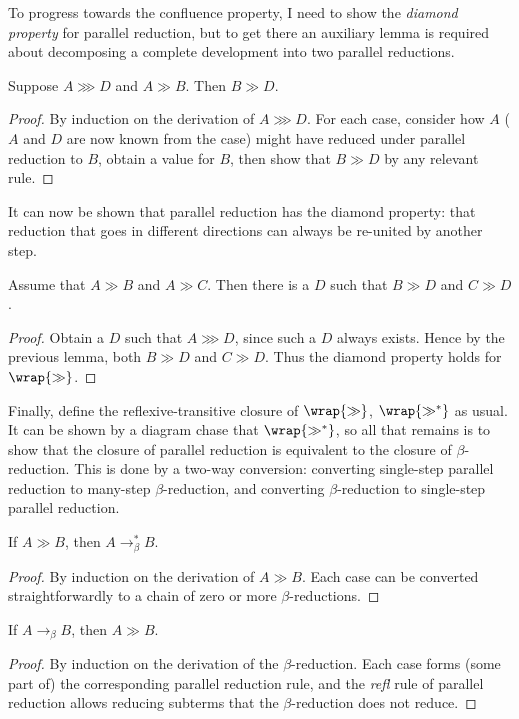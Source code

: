 To progress towards the confluence property, I need to show the \emph{diamond property} for parallel reduction, but to get there an auxiliary lemma is required about decomposing a complete development into two parallel reductions.

\begin{lemma}
Suppose \(A \ggg D\) and \(A \gg B\).
Then \(B \gg D\).
\end{lemma}
\begin{proof}
By induction on the derivation of \(A \ggg D\).
For each case, consider how \(A\) (\(A\) and \(D\) are now known from the case) might have reduced under parallel reduction to \(B\), obtain a value for \(B\), then show that \(B \gg D\) by any relevant rule.
\end{proof}

It can now be shown that parallel reduction has the diamond property: that reduction that goes in different directions can always be re-united by another step.

\begin{lemma}
Assume that \(A \gg B\) and \(A \gg C\).
Then there is a \(D\) such that \(B \gg D\) and \(C \gg D\).
\end{lemma}
\begin{proof}
Obtain a \(D\) such that \(A \ggg D\), since such a \(D\) always exists.
Hence by the previous lemma, both \(B \gg D\) and \(C \gg D\).
Thus the diamond property holds for \(\wrap{\gg}\).
\end{proof}

Finally, define the reflexive-transitive closure of \(\wrap{\gg}\), \(\wrap{\gg^*}\) as usual.
It can be shown by a diagram chase that \(\wrap{\gg^*}\), so all that remains is to show that the closure of parallel reduction is equivalent to the closure of \(\beta\)-reduction.
This is done by a two-way conversion: converting single-step parallel reduction to many-step \(\beta\)-reduction, and converting \(\beta\)-reduction to single-step parallel reduction.

\begin{lemma}
If \(A \gg B\), then \(A \to_\beta^* B\).
\end{lemma}
\begin{proof}
By induction on the derivation of \(A \gg B\).
Each case can be converted straightforwardly to a chain of zero or more \(\beta\)-reductions.
\end{proof}

\begin{lemma}
If \(A \to_\beta B\), then \(A \gg B\).
\end{lemma}
\begin{proof}
By induction on the derivation of the \(\beta\)-reduction.
Each case forms (some part of) the corresponding parallel reduction rule, and the \emph{refl} rule of parallel reduction allows reducing subterms that the \(\beta\)-reduction does not reduce.
\end{proof}


